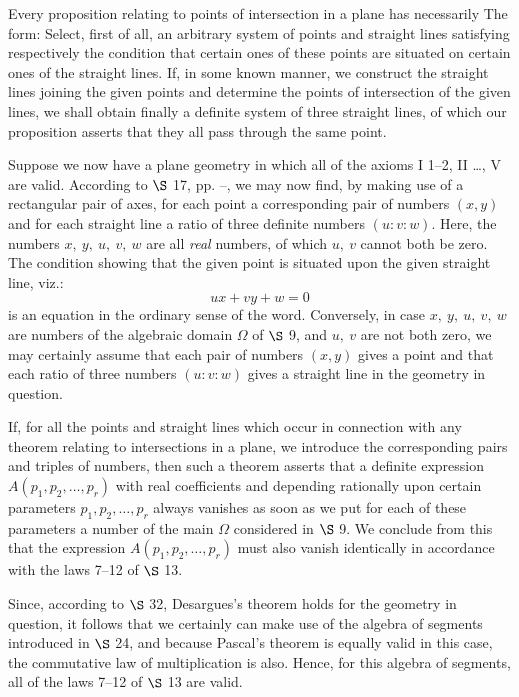 \documentclass[11pt,oneside]{book}
\begin{document}
\label{p35}

Every proposition relating to points of intersection
in a plane has necessarily The form: Select,
first of all, an arbitrary system of points and straight
lines satisfying respectively the condition that certain
ones of these points are situated on certain ones of
the straight lines. If, in some known manner, we
construct the straight lines joining the given points
and determine the points of intersection of the given
lines, we shall obtain finally a definite system of three
straight lines, of which our proposition asserts that
they all pass through the same point.

Suppose we now have a plane geometry in which
all of the axioms I 1--2, II \ldots, V are valid. According
to $\S$ 17, pp. \pageref{folio53}--\pageref{folio56}, we may now find, by making
use of a rectangular pair of axes, for each point a corresponding
pair of numbers $(x,y)$ and for each straight
line a ratio of three definite numbers $(u:v:w)$. Here,
the numbers $x,\ y,\ u,\ v,\ w$ are all \emph{real} numbers, of
which $u,\ v$ cannot both be zero. The condition showing
that the given point is situated upon the given
straight line, viz.:
\begin{equation}ux+vy+w=0\end{equation}
is an equation in the ordinary sense of the word. Conversely,
in case $x,\ y,\ u,\ v,\ w$ are numbers of the algebraic
domain $\Omega$ of $\S$ 9, and $u,\ v$ are not both zero, we
may certainly assume that each pair of numbers $(x,y)$
gives a point and that each ratio of three numbers
$(u:v:w)$ gives a straight line in the geometry in question.

If, for all the points and straight lines which occur
in connection with any theorem relating to intersections
in a plane, we introduce the corresponding pairs
and triples of numbers, then such a theorem asserts
that a definite expression $A(p_1,p_2,\ldots,p_r)$ with real
coefficients and depending rationally upon certain
parameters $p_1,p_2,\ldots,p_r$ always vanishes as soon as
we put for each of these parameters a number of the
main $\Omega$ considered in $\S$ 9. We conclude from this
that the expression $A(p_1,p_2,\dots,p_r)$ must also vanish
identically in accordance with the laws 7--12 of
$\S$ 13.

Since, according to $\S$ 32, Desargues's theorem holds
for the geometry in question, it follows that we certainly
can make use of the algebra of segments introduced
in $\S$ 24, and because Pascal's theorem is equally
valid in this case, the commutative law of multiplication
is also. Hence, for this algebra of segments, all
of the laws 7--12 of $\S$ 13 are valid.
\end{document}

